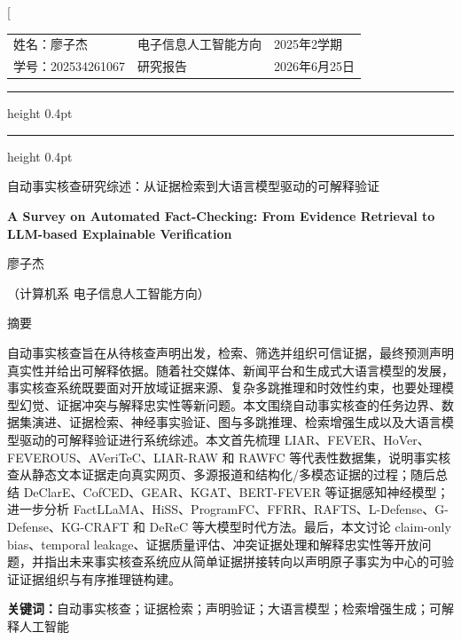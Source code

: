 \documentclass[UTF8,a4paper,zihao=5,twocolumn]{ctexart}
\makeatletter
\newcommand{\ReportName}{姓名：廖子杰}
\newcommand{\ReportAuthorName}{廖子杰}
\newcommand{\ReportMajor}{计算机系 电子信息人工智能方向}
\newcommand{\ReportStudentID}{学号：202534261067}
\newcommand{\ReportCourse}{电子信息人工智能方向}
\newcommand{\ReportType}{研究报告}
\newcommand{\ReportTerm}{2025年2学期}
\newcommand{\ReportDate}{2026年6月25日}
\newcommand{\makereportheader}{%
  {\songti\zihao{-5}
  \noindent
  \begin{tabular*}{\textwidth}{@{}p{0.28\textwidth}@{\extracolsep{\fill}}>{\centering\arraybackslash}p{0.32\textwidth}>{\raggedleft\arraybackslash}p{0.28\textwidth}@{}}
  \ReportName & \ReportCourse & \ReportTerm\\
  \ReportStudentID & \ReportType & \ReportDate
  \end{tabular*}\par
  \vspace{0.15em}
  \hrule height 0.4pt
  \vspace{0.08em}
  \hrule height 0.4pt
  \vspace{1.2em}}
}
\makeatother
\begin{document}
\twocolumn[{%
\makereportheader
\begin{center}
{\heiti{} 自动事实核查研究综述：从证据检索到大语言模型驱动的可解释验证\par}
\vspace{0.6em}
{\bfseries{} A Survey on Automated Fact-Checking: From Evidence Retrieval to LLM-based Explainable Verification\par}
\vspace{0.7em}
{\fangsong{} \ReportAuthorName\par}
\vspace{0.35em}
{\songti{} （\ReportMajor）\par}
\vspace{0.9em}
\end{center}

\begin{center}
{\heiti{} 摘\quad 要}
\end{center}
{\songti{}
自动事实核查旨在从待核查声明出发，检索、筛选并组织可信证据，最终预测声明真实性并给出可解释依据。随着社交媒体、新闻平台和生成式大语言模型的发展，事实核查系统既要面对开放域证据来源、复杂多跳推理和时效性约束，也要处理模型幻觉、证据冲突与解释忠实性等新问题。本文围绕自动事实核查的任务边界、数据集演进、证据检索、神经事实验证、图与多跳推理、检索增强生成以及大语言模型驱动的可解释验证进行系统综述。本文首先梳理 LIAR、FEVER、HoVer、FEVEROUS、AVeriTeC、LIAR-RAW 和 RAWFC 等代表性数据集，说明事实核查从静态文本证据走向真实网页、多源报道和结构化/多模态证据的过程；随后总结 DeClarE、CofCED、GEAR、KGAT、BERT-FEVER 等证据感知神经模型；进一步分析 FactLLaMA、HiSS、ProgramFC、FFRR、RAFTS、L-Defense、G-Defense、KG-CRAFT 和 DeReC 等大模型时代方法。最后，本文讨论 claim-only bias、temporal leakage、证据质量评估、冲突证据处理和解释忠实性等开放问题，并指出未来事实核查系统应从简单证据拼接转向以声明原子事实为中心的可验证证据组织与有序推理链构建。
\par}
\vspace{0.5em}
{\songti{}\noindent\textbf{关键词：}自动事实核查；证据检索；声明验证；大语言模型；检索增强生成；可解释人工智能}
\vspace{0.7em}

}
\end{document}

